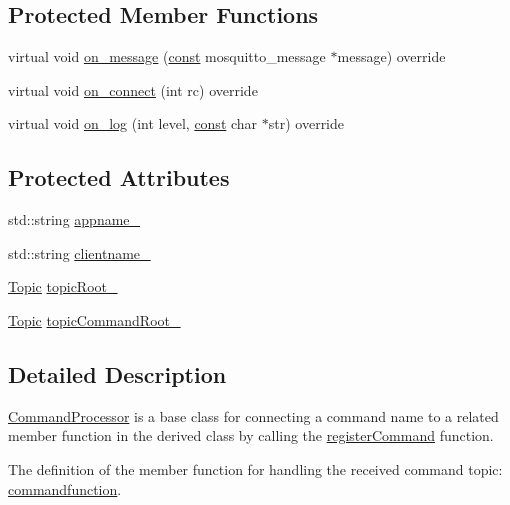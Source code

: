 \subsection*{Protected Member Functions}
\begin{DoxyCompactItemize}
\item 
virtual void \hyperlink{class_command_processor_ab1a2cf5d74c8bbd9bbcf57c7a4b14c66}{on\+\_\+message} (\hyperlink{functions__c_8js_afacfd9c985d225bb07483b887a801b6f}{const} mosquitto\+\_\+message $\ast$message) override
\item 
virtual void \hyperlink{class_command_processor_a242db95796f5dd1b17a139ed19d6ecfa}{on\+\_\+connect} (int rc) override
\item 
virtual void \hyperlink{class_command_processor_a7300ca2e9cd0237f17ce82f64123e553}{on\+\_\+log} (int level, \hyperlink{functions__c_8js_afacfd9c985d225bb07483b887a801b6f}{const} char $\ast$str) override
\end{DoxyCompactItemize}
\subsection*{Protected Attributes}
\begin{DoxyCompactItemize}
\item 
std\+::string \hyperlink{class_command_processor_aab13edb02dbcc123e831e1cce20695a0}{appname\+\_\+}
\item 
std\+::string \hyperlink{class_command_processor_a3922d658643297c47765181a251b10d3}{clientname\+\_\+}
\item 
\hyperlink{class_topic}{Topic} \hyperlink{class_command_processor_a97f0d615c62c8c7e1712522c4577ea53}{topic\+Root\+\_\+}
\item 
\hyperlink{class_topic}{Topic} \hyperlink{class_command_processor_ac695d4ff50c2dd91b25c8079b22170e4}{topic\+Command\+Root\+\_\+}
\end{DoxyCompactItemize}


\subsection{Detailed Description}
\hyperlink{class_command_processor}{Command\+Processor} is a base class for connecting a command name to a related member function in the derived class by calling the \hyperlink{class_command_processor_a72e15bc0082d628bd05aacedd5aa7ee0}{register\+Command} function.

The definition of the member function for handling the received command topic\+: \hyperlink{commandprocessor_8h_a41e93010c5b147d1499d44b2c6525881}{commandfunction}.

